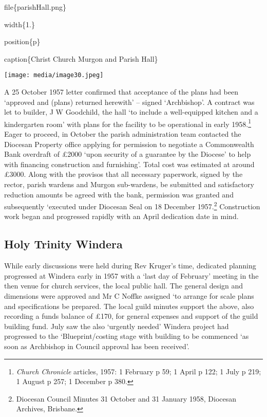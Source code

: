 file\{parishHall.png\}

width\{1.\}

position\{p\}

caption\{Christ Church Murgon and Parish Hall\}

\texttt{[image: media/image30.jpeg]}

A 25 October 1957 letter confirmed that acceptance of the plans had been `approved and (plans) returned herewith' -- signed `Archbishop'. A contract was let to builder, J W Goodchild, the hall `to include a well-equipped kitchen and a kindergarten room' with plans for the facility to be operational in early 1958.\footnote{\emph{Church Chronicle} articles, 1957: 1 February p 59; 1 April p 122; 1 July p 219; 1 August p 257; 1 December p 380.} Eager to proceed, in October the parish administration team contacted the Diocesan Property office applying for permission to negotiate a Commonwealth Bank overdraft of £2000 `upon security of a guarantee by the Diocese' to help with financing construction and furnishing'. Total cost was estimated at around £3000. Along with the provisos that all necessary paperwork, signed by the rector, parish wardens and Murgon sub-wardens, be submitted and satisfactory reduction amounts be agreed with the bank, permission was granted and subsequently `executed under Diocesan Seal on 18 December 1957.\footnote{Diocesan Council Minutes 31 October and 31 January 1958, Diocesan Archives, Brisbane.} Construction work began and progressed rapidly with an April dedication date in mind.

\hypertarget{holy-trinity-windera}{%
\subsection{Holy Trinity Windera}\label{holy-trinity-windera}}

While early discussions were held during Rev Kruger's time, dedicated planning progressed at Windera early in 1957 with a `last day of February' meeting in the then venue for church services, the local public hall. The general design and dimensions were approved and Mr C Noffke assigned `to arrange for scale plans and specifications be prepared. The local guild minutes support the above, also recording a funds balance of £170, for general expenses and support of the guild building fund. July saw the also `urgently needed' Windera project had progressed to the `Blueprint/costing stage with building to be commenced `as soon as Archbishop in Council approval has been received'.


